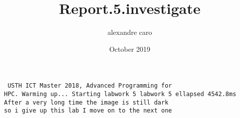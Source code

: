\documentclass{article} \usepackage[utf8]{inputenc} \title{Report.5.investigate} \author{alexandre caro }
\date{October 2019}
\begin{document}
 \maketitle \begin{verbatim} USTH ICT Master 2018, Advanced Programming for 
HPC. Warming up... Starting labwork 5 labwork 5 ellapsed 4542.8ms After a very long time the image is still dark 
so i give up this lab I move on to the next one \end{verbatim} 
\end{document}
